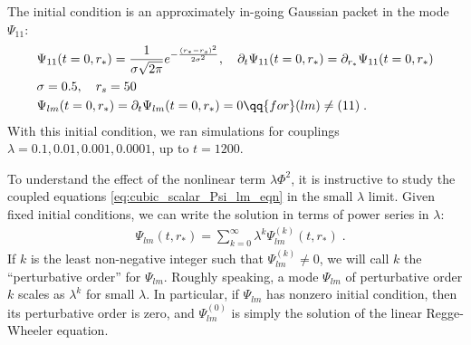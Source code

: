 The initial condition is an approximately in-going Gaussian packet in the mode $\Psi_{11}$:
\begin{align}
  \label{eq:cubic_scalar_Psi_IC}
  &\Psi_{11}(t=0,r_*) = \frac{1}{\sigma \sqrt{2\pi}} e^{-\frac{(r_*-r_s)^2}{2 \sigma^2 }},\quad
                       \partial_t\Psi_{11}(t=0,r_*) = \partial_{r_*} \Psi_{11}(t=0,r_*) \nonumber \\
  &  \sigma = 0.5,\quad r_s = 50 \nonumber \\
  & \Psi_{lm}(t=0,r_*) = \partial_t \Psi_{lm}(t=0,r_*) = 0 \qq{for} (lm) \neq (11) \;.
\end{align}
With this initial condition, we ran simulations for couplings $\lambda = 0.1, 0.01, 0.001, 0.0001$, up to $t=1200$.




\label{sec:coupled_simulation_analytical}
To understand the effect of the nonlinear term $\lambda \Phi^2$, it is instructive to study the coupled equations \eqref{eq:cubic_scalar_Psi_lm_eqn} in the small $\lambda$ limit.
Given fixed initial conditions, we can write the solution in terms of power series in $\lambda$:
\begin{align}
  & \Psi_{lm}(t, r_*) = \sum_{k=0}^\infty \lambda^k \Psi_{lm}^{(k)}(t, r_*) \;.
\end{align}
If $k$ is the least non-negative integer such that $\Psi_{lm}^{(k)} \neq 0$, we will call $k$ the ``perturbative order'' for $\Psi_{lm}$.
Roughly speaking, a mode $\Psi_{lm}$ of perturbative order $k$ scales as $\lambda^k$ for small $\lambda$.
In particular, if $\Psi_{lm}$ has nonzero initial condition, then its perturbative order is zero, and $\Psi_{lm}^{(0)}$ is simply the solution of the linear Regge-Wheeler equation.


